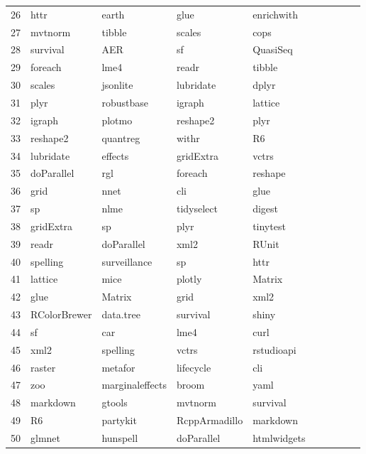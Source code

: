 \begin{table}[h]
\begin{center}
{\begin{tabular}{llllllllll}
 26 & httr & earth & glue & enrichwith \\
 27 & mvtnorm & tibble & scales & cops \\
 28 & survival & AER & sf & QuasiSeq \\
 29 & foreach & lme4 & readr & tibble \\
 30 & scales & jsonlite & lubridate & dplyr \\
 31 & plyr & robustbase & igraph & lattice \\
 32 & igraph & plotmo & reshape2 & plyr \\
 33 & reshape2 & quantreg & withr & R6 \\
 34 & lubridate & effects & gridExtra & vctrs \\
 35 & doParallel & rgl & foreach & reshape \\
 36 & grid & nnet & cli & glue \\
 37 & sp & nlme & tidyselect & digest \\
 38 & gridExtra & sp & plyr & tinytest \\
 39 & readr & doParallel & xml2 & RUnit \\
 40 & spelling & surveillance & sp & httr \\
 41 & lattice & mice & plotly & Matrix \\
 42 & glue & Matrix & grid & xml2 \\
 43 & RColorBrewer & data.tree & survival & shiny \\
 44 & sf & car & lme4 & curl \\
 45 & xml2 & spelling & vctrs & rstudioapi \\
 46 & raster & metafor & lifecycle & cli \\
 47 & zoo & marginaleffects & broom & yaml \\
 48 & markdown & gtools & mvtnorm & survival \\
 49 & R6 & partykit & RcppArmadillo & markdown \\
 50 & glmnet & hunspell & doParallel & htmlwidgets \\
\bottomrule
\end{tabular}
}
\end{center}
\end{table}


